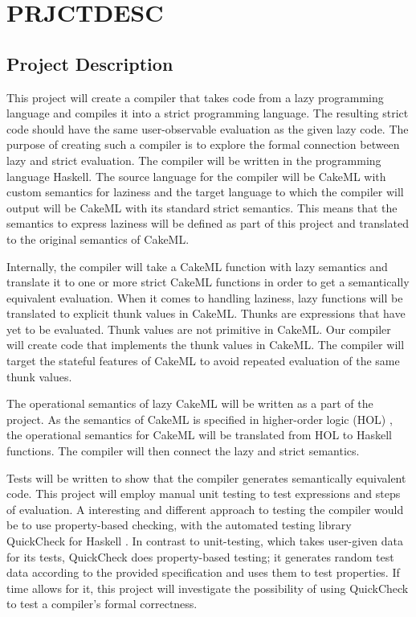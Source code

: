 \chapter{PRJCTDESC}
\section{Project Description}

This project will create a compiler that takes code from a lazy programming
language and compiles it into a strict programming language. The resulting
strict code should have the same user-observable evaluation as the given lazy
code. The purpose of creating such a compiler is to explore the formal
connection between lazy and strict evaluation. The compiler will be written in
the programming language Haskell. The source language for the compiler will be
CakeML with custom semantics for laziness and the target language to which
the compiler will output will be CakeML with its standard strict semantics. This
means that the semantics to express laziness will be defined as part of this
project and translated to the original semantics of CakeML.

Internally, the compiler will take a
CakeML function with lazy semantics and translate it to one
or more strict CakeML functions in order to get a semantically equivalent
evaluation. When it comes to handling laziness, lazy functions will be
translated to explicit thunk values\cite{Ingerman:1961:TWC:366062.366084} in
CakeML. Thunks are expressions that have yet to be evaluated. Thunk values are
not primitive in CakeML. Our compiler will create code that
implements the thunk values in CakeML. The compiler will target the stateful
features of CakeML to avoid repeated evaluation of the same thunk values.

The operational semantics of lazy CakeML will be written as a part of the
project. As the semantics of CakeML is specified in higher-order logic (HOL)
\cite{HOLInter57:online},
the operational semantics for CakeML will be translated from HOL to Haskell
functions. The compiler will then connect the lazy and strict semantics.

Tests will be written to show that the compiler generates semantically
equivalent code. This project will employ manual unit testing to test
expressions and steps of evaluation.
A interesting and different approach to testing the compiler would be to
use property-based checking, with the automated testing library QuickCheck for
Haskell \cite{Introduc44:online}. In contrast to
unit-testing, which takes user-given data for its tests, QuickCheck does
property-based testing; it generates random test data according to the provided
specification and uses them to test properties. If time allows for it, this 
project will investigate
the possibility of using QuickCheck to test a compiler's formal correctness.

